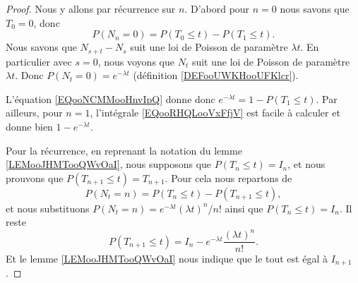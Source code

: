 \begin{proof}
    Nous y allons par récurrence sur \( n\). D'abord pour \( n=0\) nous savons que \( T_0=0\), donc
    \begin{equation}        \label{EQooNCMMooHnvIpQ}
        P(N_n=0)=P(T_0\leq t)-P(T_1\leq t).
    \end{equation}
    Nous savons que \( N_{s+t}-N_s\) suit une loi de Poisson de paramètre \( \lambda t\). En particulier avec \( s=0\), nous voyons que \( N_t\) suit une loi de Poisson de paramètre \( \lambda t\). Donc \( P(N_t=0)= e^{-\lambda t}\) (définition \ref{DEFooUWKHooUFKlcr}).

    L'équation \ref{EQooNCMMooHnvIpQ} donne donc \(  e^{-\lambda t}=1-P(T_1\leq t)\). Par ailleurs, pour \( n=1\), l'intégrale \eqref{EQooRHQLooVxFfjV} est facile à calculer et donne bien \( 1- e^{-\lambda t}\).

    Pour la récurrence, en reprenant la notation du lemme \ref{LEMooJHMTooQWvOaI}, nous supposons que \( P(T_n\leq t)=I_n\), et nous prouvons que \( P(T_{n+1}\leq t)=T_{n+1}\). Pour cela nous repartons de 
    \begin{equation}
        P(N_t=n)=P(T_n\leq t)-P(T_{n+1}\leq t),
    \end{equation}
    et nous substituons \( P(N_t=n)= e^{-\lambda t}(\lambda t)^n/n!\) ainsi que \( P(T_n\leq t)=I_n\). Il reste
    \begin{equation}
        P(T_{n+1}\leq t)=I_n- e^{-\lambda t}\frac{ (\lambda t)^n }{ n! }.
    \end{equation}
    Et le lemme \ref{LEMooJHMTooQWvOaI} nous indique que le tout est égal à \( I_{n+1}\).
\end{proof}

